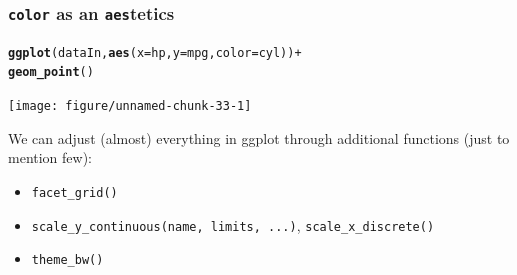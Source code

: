 \documentclass[12pt]{beamer}\usepackage[]{graphicx}\usepackage[]{color}
\makeatletter
\newcommand{\hlopt}[1]{\textcolor[rgb]{0,0,0}{#1}}%
\newcommand{\hlstd}[1]{\textcolor[rgb]{0.345,0.345,0.345}{#1}}%
\newcommand{\hlkwc}[1]{\textcolor[rgb]{0.333,0.667,0.333}{#1}}%
\newcommand{\hlkwd}[1]{\textcolor[rgb]{0.737,0.353,0.396}{\textbf{#1}}}%
\newenvironment{kframe}{%
 \def\at@end@of@kframe{}%
 \ifinner\ifhmode%
  \def\at@end@of@kframe{\end{minipage}}%
  \begin{minipage}{\columnwidth}%
 \fi\fi%
 \def\FrameCommand##1{\hskip\@totalleftmargin \hskip-\fboxsep
 \colorbox{shadecolor}{##1}\hskip-\fboxsep
     \hskip-\linewidth \hskip-\@totalleftmargin \hskip\columnwidth}%
 \MakeFramed {\advance\hsize-\width
   \@totalleftmargin\z@ \linewidth\hsize
   \@setminipage}}%
 {\par\unskip\endMakeFramed%
 \at@end@of@kframe}
\newenvironment{knitrout}{}{} %
\makeatother
\begin{document}

\begin{frame}[fragile]\centering
\frametitle{\texttt{color} as an \texttt{aes}tetics}

\begin{knitrout}\footnotesize
{}\color{fgcolor}\begin{kframe}
\begin{alltt}
\hlkwd{ggplot}\hlstd{(dataIn,} \hlkwd{aes}\hlstd{(}\hlkwc{x}\hlstd{=hp,} \hlkwc{y}\hlstd{=mpg,} \hlkwc{color}\hlstd{=cyl))} \hlopt{+}
  \hlkwd{geom_point}\hlstd{()}
\end{alltt}
\end{kframe}
\texttt{[image: figure/unnamed-chunk-33-1]} 

\end{knitrout}

\end{frame}




\begin{frame}[fragile]\large

We can adjust (almost) everything in ggplot through additional functions (just to mention few):

\begin{itemize}
 \item \texttt{facet\_grid()}
 \item \texttt{scale\_y\_continuous(name, limits, ...)}, \texttt{scale\_x\_discrete()}
 \item \texttt{theme\_bw()}
\end{itemize}

\end{frame}
\end{document}
